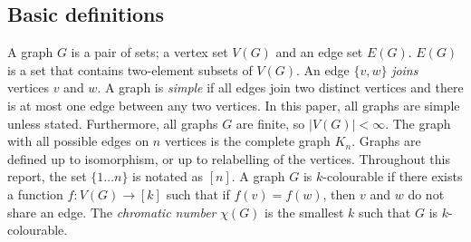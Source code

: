 
\subsection{Basic definitions}\label{sec: Basic definitions}
A graph $G$ is a pair of sets; a vertex set $V(G)$ and an edge set $E(G)$. $E(G)$ is a set that contains two-element subsets of $V(G)$. An edge $ \{v, w\}$ \textit{joins} vertices $v$ and $w$. A graph is \textit{simple} if all edges join two distinct vertices and there is at most one edge between any two vertices. In this paper, all graphs are simple unless stated. Furthermore, all graphs $G$ are finite, so $|V(G)| < \infty$. The graph with all possible edges on $n$ vertices is the complete graph $K_n$. Graphs are defined up to isomorphism, or up to relabelling of the vertices.
Throughout this report, the set $\lbrace 1\ldots n \rbrace$ is notated as $[n]$. 
A graph \(G\) is \(k\)-colourable if there exists a function \(f: V(G) \rightarrow [k]\) such that if $f(v) = f(w)$, then $v$ and $w$ do not share an edge. The \textit{chromatic number} \(\chi(G)\) is the smallest \(k\) such that \(G\) is \(k\)-colourable.